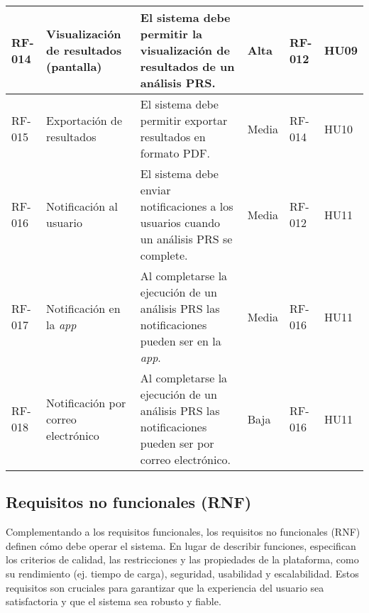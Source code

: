 \begin{longtable}{ p{1.2cm}  p{2cm}  p{3.5cm}  p{1.5cm}  p{2.2cm}  p{1.9cm} }
\midrule
    RF-014 & Visualización de resultados (pantalla) & El sistema debe permitir la visualización de resultados de un análisis PRS. & Alta & RF-012 & HU09 \\
\midrule
    RF-015 & Exportación de resultados & El sistema debe permitir exportar resultados en formato PDF. & Media & RF-014 & HU10 \\
\midrule
    RF-016 & Notificación al usuario & El sistema debe enviar notificaciones a los usuarios cuando un análisis PRS se complete. & Media & RF-012 & HU11 \\
\midrule
    RF-017 & Notificación en la \textit{app} & Al completarse la ejecución de un análisis PRS las notificaciones pueden ser en la \textit{app}. & Media & RF-016 & HU11 \\
\midrule
    RF-018 & Notificación por correo electrónico & Al completarse la ejecución de un análisis PRS las notificaciones pueden ser por correo electrónico. & Baja & RF-016 & HU11 \\
\end{longtable}

\subsection{Requisitos no funcionales (RNF)}

 Complementando a los requisitos funcionales, los requisitos no funcionales (RNF) definen cómo debe operar el sistema. En lugar de describir funciones, especifican los criterios de calidad, las restricciones y las propiedades de la plataforma, como su rendimiento (ej. tiempo de carga), seguridad, usabilidad y escalabilidad. Estos requisitos son cruciales para garantizar que la experiencia del usuario sea satisfactoria y que el sistema sea robusto y fiable.

